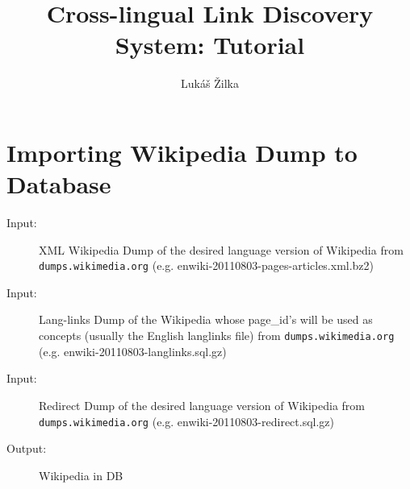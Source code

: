 \documentclass{article}
\title{Cross-lingual Link Discovery System: Tutorial}
\author{Lukáš Žilka}
\begin{document}
\maketitle

\section*{Importing Wikipedia Dump to Database}
\begin{description}
\item[Input:] XML Wikipedia Dump of the desired language version of Wikipedia from \texttt{dumps.wikimedia.org} (e.g. enwiki-20110803-pages-articles.xml.bz2)
\item[Input:] Lang-links Dump of the Wikipedia whose page\_id's will be used as concepts (usually the English langlinks file) from \texttt{dumps.wikimedia.org} (e.g. enwiki-20110803-langlinks.sql.gz)
\item[Input:] Redirect Dump of the desired language version of Wikipedia from \texttt{dumps.wikimedia.org} (e.g. enwiki-20110803-redirect.sql.gz)
\item[Output:] Wikipedia in DB
\end{description}
\end{document}
